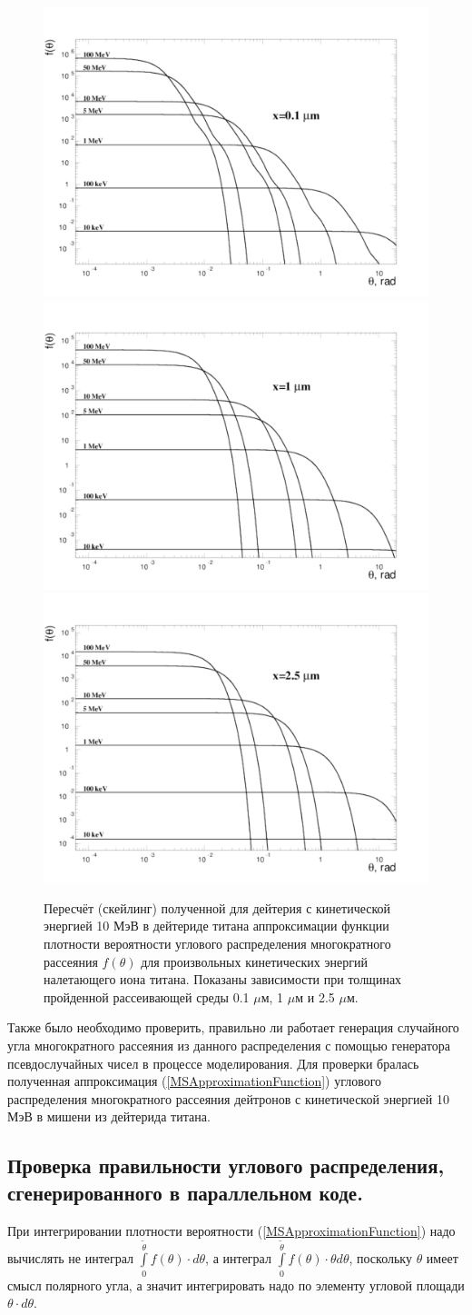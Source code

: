 \documentclass[a4paper,12pt]{article}
\begin{document}
\begin{large}
\begin{figure}[ht]
{
   \includegraphics[width=0.32\linewidth]{images/funtheta_0_1mkm_ti.pdf}
   \includegraphics[width=0.32\linewidth]{images/funtheta_1mkm_ti.pdf}
   \includegraphics[width=0.32\linewidth]{images/funtheta_2_5mkm_ti.pdf}
}
\caption{Пересчёт (скейлинг) полученной для дейтерия с кинетической энергией 10 МэВ в дейтериде титана аппроксимации функции плотности вероятности углового распределения многократного рассеяния $f(\theta)$ для произвольных кинетических энергий налетающего иона титана.
	Показаны зависимости при толщинах пройденной рассеивающей среды 0.1 $\mu$м, 1 $\mu$м и 2.5 $\mu$м.}
\label{fig:MFthetaScalingTitan}
\end{figure}

	Также было необходимо проверить, правильно ли работает генерация случайного угла многократного рассеяния из данного распределения с помощью генератора псевдослучайных чисел в процессе моделирования.
	Для проверки бралась полученная аппроксимация (\ref{MSApproximationFunction}) углового распределения многократного рассеяния дейтронов с кинетической энергией 10 МэВ в мишени из дейтерида титана.
	
\subsection{Проверка правильности углового распределения, сгенерированного в параллельном коде.}
\label{subValMS3}

	При интегрировании плотности вероятности (\ref{MSApproximationFunction}) надо вычислять не интеграл $\int\limits_{0}^{\tilde \theta} f(\theta) \cdot d\theta$, а интеграл $\int\limits_{0}^{\tilde \theta} f(\theta) \cdot \theta d\theta$, поскольку $\theta$ имеет смысл полярного угла, а значит интегрировать надо по элементу угловой площади $\theta \cdot d \theta$.
	

\end{large}
\end{document}
